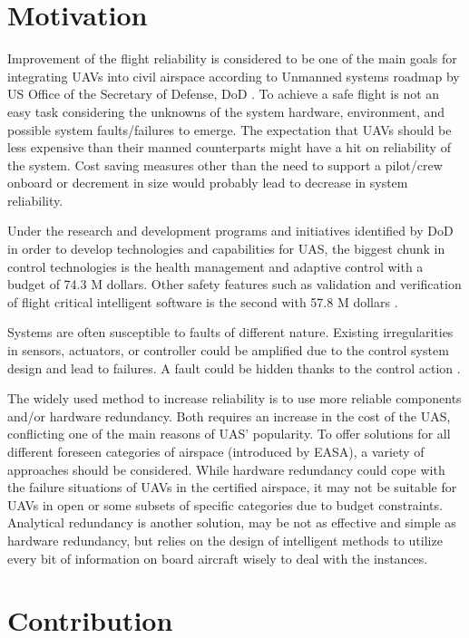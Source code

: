 \section{Motivation}

Improvement of the flight reliability is considered to be one of the main goals for integrating UAVs into civil airspace according to Unmanned systems roadmap by US Office of the Secretary of Defense, DoD \cite{UnmannedSystemsRoadmapDoD}. 
To achieve a safe flight is not an easy task considering the unknowns of the system hardware, environment, and possible system faults/failures to emerge. 
The expectation that UAVs should be less expensive than their manned counterparts might have a hit on reliability of the system. Cost saving measures other than the need to support a pilot/crew onboard or decrement in size would probably lead to decrease in system reliability.

Under the research and development programs and initiatives identified by DoD in order to develop technologies and capabilities for UAS, the biggest chunk in control technologies is the health management and adaptive control with a budget of 74.3 M dollars. 
Other safety features such as validation and verification of flight critical intelligent software is the second with 57.8 M dollars \cite{UnmannedSystemsRoadmapDoD}. 

Systems are often susceptible to faults of different nature. Existing irregularities in sensors, actuators, or controller could be amplified due to the control system design and lead to failures. A fault could be hidden thanks to the control action \cite{ducard2009fault}.

The widely used method to increase reliability is to use more reliable components and/or hardware redundancy. Both requires an increase in the cost of the UAS, conflicting one of the main reasons of UAS' popularity\cite{angelov2012sense}. To offer solutions for all different foreseen categories of airspace (introduced by EASA), a variety of approaches should be considered. While hardware redundancy could cope with the failure situations of UAVs in the certified airspace, it may not be suitable for UAVs in open or some subsets of specific categories due to budget constraints. Analytical redundancy is another solution, may be not as effective and simple as hardware redundancy, but relies on the design of intelligent methods to utilize every bit of information on board aircraft wisely to deal with the instances.  

\section{Contribution}

